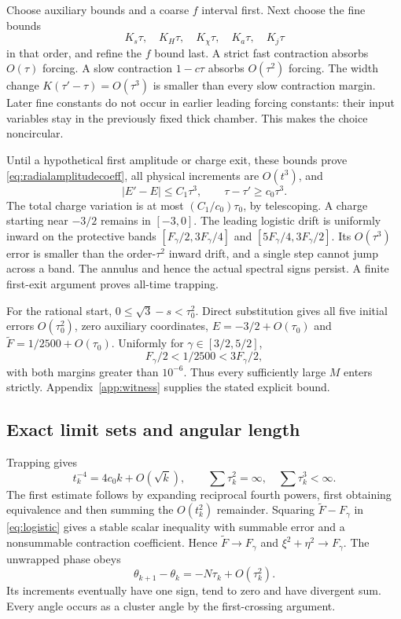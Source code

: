 \documentclass[11pt]{article}
\theoremstyle{remark}\newtheorem{remark}[theorem]{Remark}
\numberwithin{equation}{section}
\begin{document}
Choose auxiliary bounds and a coarse $f$ interval first. Next choose the fine bounds
\[K_s\tau,\quad K_H\tau,\quad K_\chi\tau,\quad K_a\tau,\quad K_j\tau\]
in that order, and refine the $f$ bound last. A strict fast contraction absorbs $O(\tau)$ forcing. A slow contraction $1-c\tau$ absorbs $O(\tau^2)$ forcing. The width change $K(\tau'-\tau)=O(\tau^3)$ is smaller than every slow contraction margin. Later fine constants do not occur in earlier leading forcing constants: their input variables stay in the previously fixed thick chamber. This makes the choice noncircular.

Until a hypothetical first amplitude or charge exit, these bounds prove \eqref{eq:radialamplitudecoeff}, all physical increments are $O(t^3)$, and
\[
 |E'-E|\leq C_1\tau^3,\qquad \tau-\tau'\geq c_0\tau^3.
\]
The total charge variation is at most $(C_1/c_0)\tau_0$, by telescoping. A charge starting near $-3/2$ remains in $[-3,0]$. The leading logistic drift is uniformly inward on the protective bands $[F_\gamma/2,3F_\gamma/4]$ and $[5F_\gamma/4,3F_\gamma/2]$. Its $O(\tau^3)$ error is smaller than the order-$\tau^2$ inward drift, and a single step cannot jump across a band. The annulus and hence the actual spectral signs persist. A finite first-exit argument proves all-time trapping.

For the rational start, $0\leq\sqrt3-s<\tau_0^2$. Direct substitution gives all five initial errors $O(\tau_0^2)$, zero auxiliary coordinates, $E=-3/2+O(\tau_0)$ and $\widetilde F=1/2500+O(\tau_0)$. Uniformly for $\gamma\in[3/2,5/2]$,
\[
 F_\gamma/2<1/2500<3F_\gamma/2,
\]
with both margins greater than $10^{-6}$. Thus every sufficiently large $M$ enters strictly. Appendix~\ref{app:witness} supplies the stated explicit bound.

\subsection{Exact limit sets and angular length}
Trapping gives
\[
 t_k^{-4}=4c_0k+O(\sqrt{k}),\qquad
 \sum\tau_k^2=\infty,\quad\sum\tau_k^3<\infty.
\]
The first estimate follows by expanding reciprocal fourth powers, first obtaining equivalence and then summing the $O(t_k^2)$ remainder. Squaring $\widetilde F-F_\gamma$ in \eqref{eq:logistic} gives a stable scalar inequality with summable error and a nonsummable contraction coefficient. Hence $\widetilde F\to F_\gamma$ and $\xi^2+\eta^2\to F_\gamma$. The unwrapped phase obeys
\[
 \theta_{k+1}-\theta_k=-N\tau_k+O(\tau_k^2).
\]
Its increments eventually have one sign, tend to zero and have divergent sum. Every angle occurs as a cluster angle by the first-crossing argument.
\end{document}
